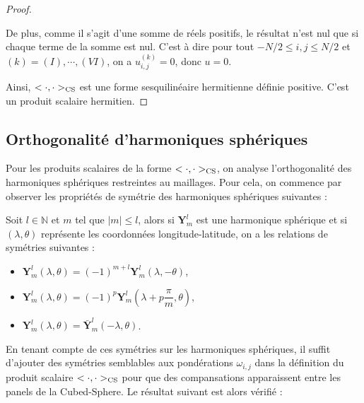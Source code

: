 \begin{proof}
\begin{itemize}
De plus, comme il s'agit d'une somme de réels positifs, le résultat n'est nul que si chaque terme de la somme est nul. C'est à dire pour tout $-N/2 \leq i,j \leq N/2$ et $(k)=(I) , \cdots, (VI)$, on a $u_{i,j}^{(k)}=0$, donc $u=0$.
\end{itemize}
Ainsi, $<\cdot, \cdot>_{\text{CS}}$ est une forme sesquilinéaire hermitienne définie positive. C'est un produit scalaire hermitien.
\end{proof}














\subsection{Orthogonalité d'harmoniques sphériques}

Pour les produits scalaires de la forme $<\cdot, \cdot>_{\text{CS}}$, on analyse l'orthogonalité des harmoniques sphériques restreintes au maillages. Pour cela, on commence par observer les propriétés de symétrie des harmoniques sphériques suivantes :

\begin{lemme}
Soit $l \in \mathbb{N}$ et $m$ tel que $|m| \leq l$, alors si $\mathbf{Y}_m^l$ est une harmonique sphérique et si $(\lambda, \theta)$ représente les coordonnées longitude-latitude, on a les relations de symétries suivantes :
\begin{itemize}
\item $\mathbf{Y}^l_m (\lambda, \theta) = (-1)^{m+l} \mathbf{Y}^l_m (\lambda, -\theta)$,
\item $\mathbf{Y}^l_m (\lambda, \theta) = (-1)^p \mathbf{Y}^l_m \left(\lambda + p \dfrac{\pi}{m}, \theta \right)$,
\item $\mathbf{Y}^l_m (\lambda, \theta) = \bar{\mathbf{Y}}^l_m (-\lambda, \theta)$.
\end{itemize}
\label{lem:HS_sym}
\end{lemme}

En tenant compte de ces symétries sur les harmoniques sphériques, il suffit d'ajouter des symétries semblables aux pondérations $\omega_{i,j}$ dans la définition du produit scalaire $<\cdot, \cdot>_{\text{CS}}$ pour que des compansations apparaissent entre les panels de la Cubed-Sphere. Le résultat suivant est alors vérifié :

